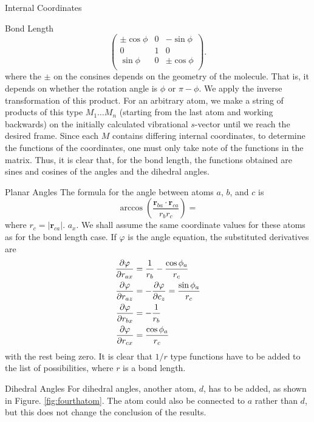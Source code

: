 \documentclass{article}
\newcommand{\fig}[1]{Figure. #1}
\newcommand{\vect}[1]{\boldsymbol{#1}}
\begin{document}
\begin{subsection}{Internal Coordinates}
\begin{subsubsection}{Bond Length}
\[\begin{pmatrix}
\pm\cos \phi & 0 & -\sin \phi \\
0 & 1 & 0 \\
\sin \phi & 0 &\pm\cos \phi   \\
\end{pmatrix}.
\]
	where the $\pm$ on the consines depends on the geometry of the molecule. That is, it depends on whether the rotation angle is $\phi$ or $\pi - \phi$. We apply the inverse transformation of this product. For an arbitrary atom, we make a string of products of this type $M_1\ldots M_n$ (starting from the last atom and working backwards) on the initially calculated vibrational $s$-vector until we reach the desired frame. Since each $M$ contains differing internal coordinates, to determine the functions of the coordinates, one must only take note of the functions in the matrix. Thus, it is clear that, for the bond length, the functions obtained are sines and cosines of the angles and the dihedral angles.    
\end{subsubsection}
\begin{subsubsection}{Planar Angles}
The formula for the angle between atoms $a$, $b$, and $c$ is 
\[
	\arccos \left ( \frac{\vect{r}_{ba} \cdot \vect{r}_{ca} }{r_b r_c} \right ) = 
\]
	where $r_c = |\vect{r}_{ca}|$.  $a_x$. We shall assume the same coordinate values for these atoms as for the bond length case. If $\varphi$ is the angle equation, the substituted derivatives are\[
\begin{split}
	\pdv{\varphi}{r_{ax}} &= \frac{1}{r_{b}} - \frac{\cos \phi_a}{r_c} \\
	\pdv{\varphi}{r_{az}} &=  -\pdv{\varphi}{c_z} =  \frac{\sin \phi_a}{r_c} \\ 
	\pdv{\varphi}{r_{bx}} &= -\frac{1}{r_{b}} \\
	\pdv{\varphi}{r_{cx}} &= \frac{\cos\phi_{a}}{r_{c}} \\ 
\end{split}
\]
with the rest being zero. It is clear that $1/r$ type functions have to be added to the list of possibilities, where $r$ is a bond length. 
\end{subsubsection}
	\begin{subsubsection}{Dihedral Angles}
		For dihedral angles, another atom, $d$, has to be added, as shown in \fig{\ref{fig:fourthatom}}. The atom could also be connected to $a$ rather than $d$, but this does not change the conclusion of the results.  
\begin{figure}[htbp!]
\centering
\end{figure}
\end{subsubsection}
\end{subsection}
\end{document}
